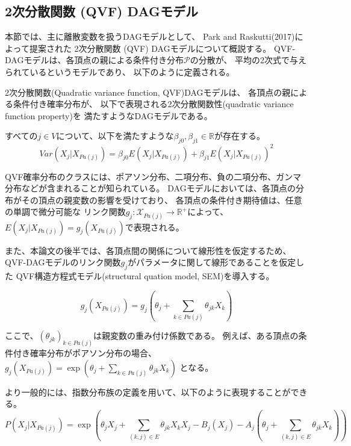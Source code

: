 
\subsection{2次分散関数 (QVF) DAGモデル}

本節では、主に離散変数を扱うDAGモデルとして、
Park and Raskutti(2017)\cite{Park2017-hw}によって提案された
2次分散関数 (QVF) DAGモデルについて概説する。
QVF-DAGモデルは、各頂点の親による条件付き分布$\mathcal P$の分散が、
平均の2次式で与えられているというモデルであり、
以下のように定義される。

\begin{df}
2次分散関数(Quadratic variance function, QVF)DAGモデルは、
各頂点の親による条件付き確率分布が、
以下で表現される2次分散関数性(quadratic variance function property)を
満たすようなDAGモデルである。

すべての$j \in V$について、以下を満たすような$\beta_{j0}, \beta_{j1} \in \mathbb R$が存在する。
  \begin{equation}
      \mathit{Var}(X_j|X_{Pa(j)}) = \beta_{j0} E(X_j | X_{Pa(j)}) + \beta_{j1} E(X_j | X_{Pa(j)})^2
      \label{QVF}
  \end{equation}
\end{df}

QVF確率分布のクラスには、ポアソン分布、二項分布、負の二項分布、ガンマ分布などが含まれることが知られている。
DAGモデルにおいては、各頂点の分布がその頂点の親変数の影響を受けており、
各頂点の条件付き期待値は、任意の単調で微分可能な
リンク関数$g_j \colon \mathcal X_{Pa(j)} \rightarrow \mathbb R^+$によって、
$E(X_j|X_{Pa(j)}) = g_j(X_{Pa(j)})$で表現される。

また、本論文の後半では、各頂点間の関係について線形性を仮定するため、
QVF-DAGモデルのリンク関数$g_j$がパラメータに関して線形であることを仮定した
QVF構造方程式モデル(structural quation model, SEM)を導入する。

\begin{equation}
  g_j(X_{Pa(j)}) = g_j \left(\theta_j + \sum_{k \in Pa(j)} \theta_{jk}X_k \right)
\end{equation}

ここで、$(\theta_{jk})_{k \in Pa(j)}$は親変数の重み付け係数である。
例えば、ある頂点の条件付き確率分布がポアソン分布の場合、
$g_j(X_{Pa(j)}) = \exp(\theta_j + \sum_{k \in Pa(j)} \theta_{jk}X_k)$
となる。

より一般的には、指数分布族の定義を用いて、以下のように表現することができる。
\begin{equation}
  P(X_j|X_{Pa(j)}) = \exp \left( \theta_{j}X_j  + \sum_{(k,j)\in E} \theta_{jk}X_k X_j -
  B_j(X_j) - A_j \left( \theta_{j} + \sum_{(k,j) \in E} \theta_{jk} X_k \right) \right)
\end{equation}

